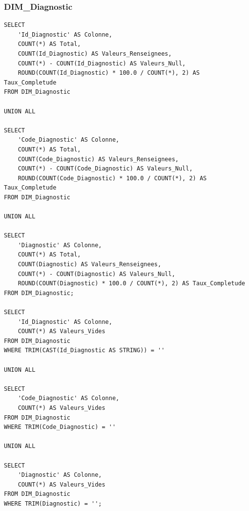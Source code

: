 \subsubsection{DIM\_Diagnostic}

\begin{verbatim}
SELECT
    'Id_Diagnostic' AS Colonne,
    COUNT(*) AS Total,
    COUNT(Id_Diagnostic) AS Valeurs_Renseignees,
    COUNT(*) - COUNT(Id_Diagnostic) AS Valeurs_Null,
    ROUND(COUNT(Id_Diagnostic) * 100.0 / COUNT(*), 2) AS Taux_Completude
FROM DIM_Diagnostic

UNION ALL

SELECT
    'Code_Diagnostic' AS Colonne,
    COUNT(*) AS Total,
    COUNT(Code_Diagnostic) AS Valeurs_Renseignees,
    COUNT(*) - COUNT(Code_Diagnostic) AS Valeurs_Null,
    ROUND(COUNT(Code_Diagnostic) * 100.0 / COUNT(*), 2) AS Taux_Completude
FROM DIM_Diagnostic

UNION ALL

SELECT
    'Diagnostic' AS Colonne,
    COUNT(*) AS Total,
    COUNT(Diagnostic) AS Valeurs_Renseignees,
    COUNT(*) - COUNT(Diagnostic) AS Valeurs_Null,
    ROUND(COUNT(Diagnostic) * 100.0 / COUNT(*), 2) AS Taux_Completude
FROM DIM_Diagnostic;

SELECT
    'Id_Diagnostic' AS Colonne,
    COUNT(*) AS Valeurs_Vides
FROM DIM_Diagnostic
WHERE TRIM(CAST(Id_Diagnostic AS STRING)) = ''

UNION ALL

SELECT
    'Code_Diagnostic' AS Colonne,
    COUNT(*) AS Valeurs_Vides
FROM DIM_Diagnostic
WHERE TRIM(Code_Diagnostic) = ''

UNION ALL

SELECT
    'Diagnostic' AS Colonne,
    COUNT(*) AS Valeurs_Vides
FROM DIM_Diagnostic
WHERE TRIM(Diagnostic) = '';
\end{verbatim}
